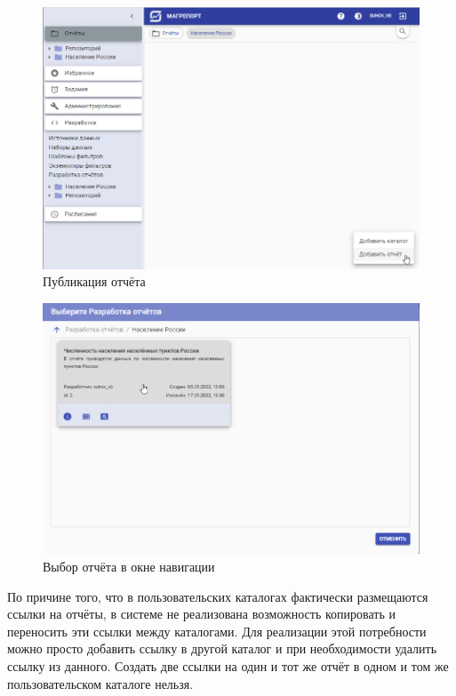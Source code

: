 \documentclass[../user-manual.tex]{subfiles}
\begin{document}
	\begin{figure}[h]
		\centering
		\includegraphics[width=\graphicswidth]{img/17-publishing-report.png}
		\caption{Публикация отчёта}
		\label{fig:publishing-report}
	\end{figure}		

	\begin{figure}[h]
		\centering
		\includegraphics[width=\graphicswidth]{img/18-navigate-to-report.png}
		\caption{Выбор отчёта в окне навигации}
		\label{fig:navigate-to-report}
	\end{figure}	

	По причине того, что в пользовательских каталогах фактически размещаются ссылки на отчёты, в системе не реализована возможность копировать и переносить эти ссылки между каталогами. Для реализации этой потребности можно просто добавить ссылку в другой каталог и при необходимости удалить ссылку из данного. Создать две ссылки на один и тот же отчёт в одном и том же пользовательском каталоге нельзя.
	
\end{document}
